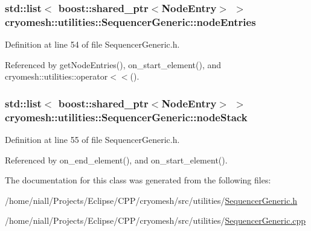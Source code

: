 \hypertarget{classcryomesh_1_1utilities_1_1SequencerGeneric_a72d9cc5d05add7cd271a6210f9164009}{
\subsubsection[{node\-Entries}]{\setlength{\rightskip}{0pt plus 5cm}std\-::list$<$ boost\-::shared\-\_\-ptr$<${\bf \-Node\-Entry}$>$ $>$ {\bf cryomesh\-::utilities\-::\-Sequencer\-Generic\-::node\-Entries}}}\label{classcryomesh_1_1utilities_1_1SequencerGeneric_a72d9cc5d05add7cd271a6210f9164009}


\-Definition at line 54 of file \-Sequencer\-Generic.\-h.



\-Referenced by get\-Node\-Entries(), on\-\_\-start\-\_\-element(), and cryomesh\-::utilities\-::operator$<$$<$().

\hypertarget{classcryomesh_1_1utilities_1_1SequencerGeneric_abf4c1421712f9ffaf5ef731d66eec5fc}{
\subsubsection[{node\-Stack}]{\setlength{\rightskip}{0pt plus 5cm}std\-::list$<$ boost\-::shared\-\_\-ptr$<${\bf \-Node\-Entry}$>$ $>$ {\bf cryomesh\-::utilities\-::\-Sequencer\-Generic\-::node\-Stack}}}\label{classcryomesh_1_1utilities_1_1SequencerGeneric_abf4c1421712f9ffaf5ef731d66eec5fc}


\-Definition at line 55 of file \-Sequencer\-Generic.\-h.



\-Referenced by on\-\_\-end\-\_\-element(), and on\-\_\-start\-\_\-element().



\-The documentation for this class was generated from the following files\-:\begin{DoxyCompactItemize}
\item 
/home/niall/\-Projects/\-Eclipse/\-C\-P\-P/cryomesh/src/utilities/\hyperlink{SequencerGeneric_8h}{\-Sequencer\-Generic.\-h}\item 
/home/niall/\-Projects/\-Eclipse/\-C\-P\-P/cryomesh/src/utilities/\hyperlink{SequencerGeneric_8cpp}{\-Sequencer\-Generic.\-cpp}\end{DoxyCompactItemize}
